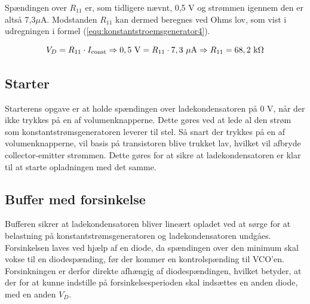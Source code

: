 Spændingen over $R_{11}$ er, som tidligere nævnt, 0,5 V og strømmen igennem den er altså 7,3$\mu$A. Modstanden $R_11$ kan dermed beregnes ved Ohms lov, som vist i udregningen i formel (\ref{equ:konstantstroemsgenerator4}).

\begin{equation}
\label{equ:konstantstroemsgenerator4}
V_D = R_{11} \cdot I_{\mathrm{const}} \Rightarrow \mathrm{0,5~V} = R_{11} \cdot \mathrm{7,3~\mu A} \Rightarrow R_{11} = \mathrm{68,2~k\ohm}
\end{equation}

\subsection*{Starter}
\label{volumenkontrol-design-starter}

Starterens opgave er at holde spændingen over ladekondensatoren på 0 V, når der ikke trykkes på en af volumenknapperne. Dette gøres ved at lede al den strøm som konstantstrømsgeneratoren leverer til stel. Så snart der trykkes på en af volumenknapperne, vil basis på transistoren blive trukket lav, hvilket vil afbryde collector-emitter strømmen. Dette gøres for at sikre at ladekondensatoren er klar til at starte opladningen med det samme.
\subsection*{Buffer med forsinkelse}
\label{volumenkontrol-design-buffer}

Bufferen sikrer at ladekondensatoren bliver lineært opladet ved at sørge for at belastning på konstantstrømsgeneratoren og ladekondensatoren undgåes. Forsinkelsen laves ved hjælp af en diode, da spændingen over den minimum skal vokse til en diodespænding, før der kommer en kontrolspænding til VCO'en. Forsinkningen er derfor direkte afhængig af diodespændingen, hvilket betyder, at der for at kunne indstille på forsinkelsesperioden skal indsættes en anden diode, med en anden $V_{D}$.
